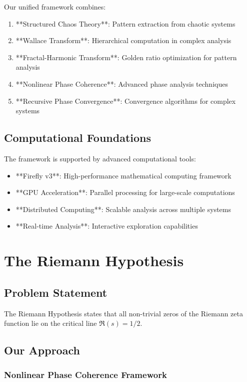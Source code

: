 \documentclass[12pt]{article}
\begin{document}
Our unified framework combines:
\begin{enumerate}
    \item **Structured Chaos Theory**: Pattern extraction from chaotic systems
    \item **Wallace Transform**: Hierarchical computation in complex analysis
    \item **Fractal-Harmonic Transform**: Golden ratio optimization for pattern analysis
    \item **Nonlinear Phase Coherence**: Advanced phase analysis techniques
    \item **Recursive Phase Convergence**: Convergence algorithms for complex systems
\end{enumerate}

\subsection{Computational Foundations}

The framework is supported by advanced computational tools:
\begin{itemize}
    \item **Firefly v3**: High-performance mathematical computing framework
    \item **GPU Acceleration**: Parallel processing for large-scale computations
    \item **Distributed Computing**: Scalable analysis across multiple systems
    \item **Real-time Analysis**: Interactive exploration capabilities
\end{itemize}

\section{The Riemann Hypothesis}

\subsection{Problem Statement}
The Riemann Hypothesis states that all non-trivial zeros of the Riemann zeta function lie on the critical line $\Re(s) = 1/2$.

\subsection{Our Approach}

\subsubsection{Nonlinear Phase Coherence Framework}
\end{document}
